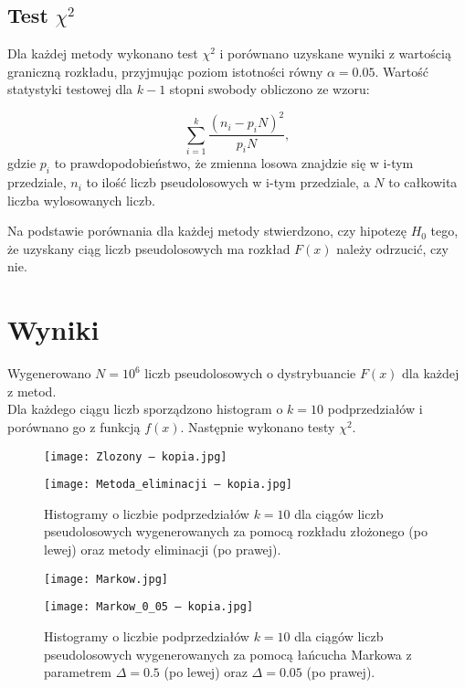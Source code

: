 \documentclass[a4paper,12pt,twoside]{article}
\begin{document}
\subsection{Test $\chi^2$}
Dla każdej metody wykonano test $\chi^2$ i porównano uzyskane wyniki z wartością graniczną rozkładu, przyjmując poziom istotności równy $\alpha = 0.05$. Wartość statystyki testowej dla $k-1$ stopni swobody obliczono ze wzoru:

\begin{equation}
    \sum_{i=1}^k\frac{(n_i - p_iN)^2}{p_iN},
    \label{eq:5}
\end{equation}
gdzie $p_i$ to prawdopodobieństwo, że zmienna losowa znajdzie się w i-tym przedziale, $n_i$ to ilość liczb pseudolosowych w i-tym przedziale, a $N$ to całkowita liczba wylosowanych liczb.

Na podstawie porównania dla każdej metody stwierdzono, czy hipotezę $H_0$ tego, że uzyskany ciąg liczb pseudolosowych ma rozkład $F(x)$ należy odrzucić, czy nie.

\section{Wyniki}
Wygenerowano $N = 10^6$ liczb pseudolosowych o dystrybuancie $F(x)$ dla każdej z metod. \\
Dla każdego ciągu liczb sporządzono histogram o $k=10$ podprzedziałów i porównano go z funkcją $f(x)$. Następnie wykonano testy $\chi^2$. 



 \begin{figure}[h!]
    \begin{minipage}{0.55\textwidth}
        \centering
        \texttt{[image: Zlozony — kopia.jpg]}
    \end{minipage}
    \begin{minipage}{0.55\textwidth}
        \texttt{[image: Metoda\_eliminacji — kopia.jpg]}
    \end{minipage}
    \caption{Histogramy o liczbie podprzedziałów $k = 10$ dla ciągów liczb pseudolosowych wygenerowanych za pomocą rozkładu złożonego (po lewej) oraz metody eliminacji (po prawej).  }
\end{figure}

 \begin{figure}[h!]
    \begin{minipage}{0.55\textwidth}
        \centering
        \texttt{[image: Markow.jpg]}
    \end{minipage}
    \begin{minipage}{0.55\textwidth}
        \texttt{[image: Markow\_0\_05 — kopia.jpg]}
    \end{minipage}
    \caption{Histogramy o liczbie podprzedziałów $k = 10$ dla ciągów liczb pseudolosowych wygenerowanych za pomocą łańcucha Markowa z parametrem $\Delta = 0.5$ (po lewej) oraz $\Delta = 0.05$ (po prawej).  }
\end{figure}
\end{document}
